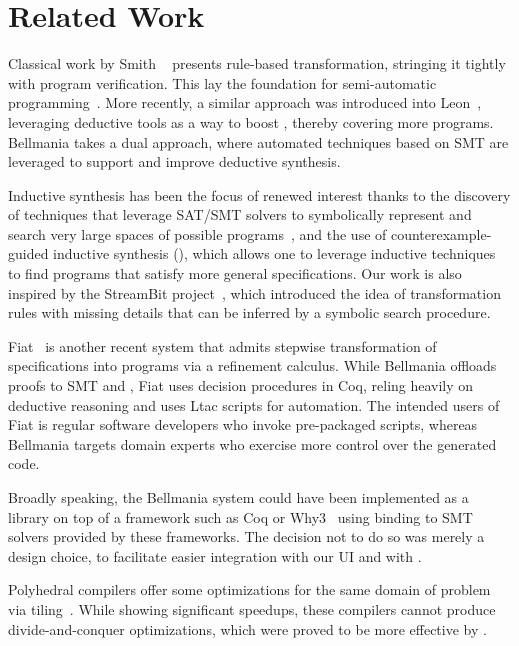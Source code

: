 \section{Related Work}
\label{related}

Classical work by Smith \etal~\cite{AI85/Smith} presents rule-based transformation, stringing it
tightly with program verification. This lay the foundation for semi-automatic programming~\cite{CPS91/Blaine,TSE90/Smith,TPHOLs96/Butler}.
More recently, a similar approach was introduced into Leon~\cite{OOPSLA13/Kneuss}, leveraging deductive
tools as a way to boost {\cegis}, thereby covering more programs. Bellmania takes a dual approach, where
automated techniques based on SMT are leveraged to support and improve deductive synthesis.

Inductive synthesis has been the focus of renewed interest thanks to the discovery of techniques that leverage SAT/SMT solvers to symbolically represent and search very large spaces of possible programs~\cite{APLAS09/Solar-Lezama, PLDI11/Gulwani, Onward13/Torlak},
and the use of counterexample-guided inductive synthesis ({\cegis}), which allows one to leverage inductive techniques to find programs that satisfy more general specifications. 
Our work is also inspired by the StreamBit project~\cite{PLDI05/Solar-Lezama}, which
introduced the idea of transformation rules with missing details that can be inferred by a symbolic search procedure.

Fiat~\cite{POPL15/Delaware} is another recent system that admits stepwise transformation of specifications
into programs via a refinement calculus. While Bellmania offloads proofs to SMT and \Sketch{},
Fiat uses decision procedures in Coq,
reling heavily on deductive reasoning and uses Ltac scripts for automation.
The intended users of Fiat is regular software developers who invoke pre-packaged scripts,
whereas Bellmania targets domain experts who exercise more control over the generated code.

Broadly speaking, the Bellmania system could have been implemented as a library on top of a framework
such as Coq or Why3~\cite{ESOP13/Filliatre} using binding to SMT solvers provided by these frameworks.
The decision not to do so was merely a design choice, to facilitate easier integration with our UI and with \Sketch{}.

Polyhedral compilers offer some optimizations for the same domain of problem via tiling~\cite{HPC10/Pouchet,PLDI08/Bondhugula}.
While showing significant speedups, these compilers cannot produce divide-and-conquer optimizations,
which were proved to be more effective by \cite{IPDPS15/Tithi}.

